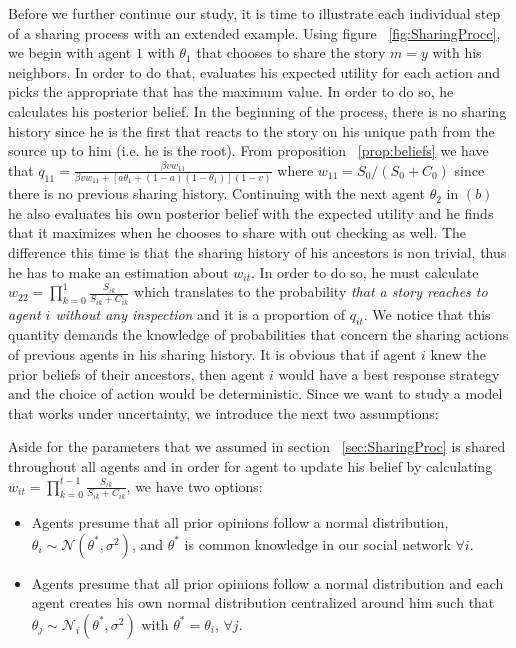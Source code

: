 Before we further continue our study, it is time to illustrate each individual step of a sharing process with an extended example. Using figure ~\ref{fig:SharingProcc}, we begin with agent $1$ with $\theta_1$ that chooses to share the story $m=y$ with his neighbors. In order to do that, evaluates his expected utility for each action and picks the appropriate that has the maximum value. In order to do so, he calculates his posterior belief. In the beginning of the process, there is no sharing history since he is the first that reacts to the story on his unique path from the source up to him (i.e. he is the root). From proposition ~\ref{prop:beliefs} we have that $q_{11}= \displaystyle\frac{\beta v w_{11}}{\beta v w_{11} + [a \theta_{1}+(1-a)(1-\theta_{1})](1-v)}$ where $w_{11}=S_0/(S_0+C_0)$ since there is no previous sharing history. Continuing with the next agent $ \theta_2$ in $(b)$ he also evaluates his own posterior belief with the expected utility and he finds that it maximizes when he chooses to share with out checking as well. The difference this time is that the sharing history of his ancestors is non trivial, thus he has to make an estimation about $w_{it}$. In order to do so, he must calculate $w_{22} = \displaystyle\prod_{k=0}^{1} \frac{S_{ik}}{S_{ik}+C_{ik}}$ which translates to the probability \textit{that a story reaches to agent $i$ without any inspection} and it is a proportion of $q_{it}$. We notice that this quantity demands the knowledge of probabilities that concern the sharing actions of previous agents in his sharing history. It is obvious that if agent $i$ knew the prior beliefs of their ancestors, then agent $i$ would have a best response strategy and the choice of action would be deterministic. Since we want to study a model that works under uncertainty, we introduce the next two assumptions:
\begin{assumption}
Aside for the parameters that we assumed in section ~\ref{sec:SharingProc} is shared throughout all agents and in order for agent to update his belief by calculating $w_{it} = \displaystyle\prod_{k=0}^{t-1} \frac{S_{ik}}{S_{ik}+C_{ik}}$, we have two options:
	\begin{itemize}
		\item Agents presume that all prior opinions follow a normal distribution, $\theta_i \sim \mathcal{N} (\theta^*,\sigma^2)$, and $\theta^*$ is common knowledge in our social network $\forall i$.
		\item Agents presume that all prior opinions follow a normal distribution and each agent creates his own normal distribution centralized around him such that $\theta_j \sim \mathcal{N}_i (\theta^*,\sigma^2)$ with $\theta^* = \theta_i$, $\forall j$.
	\end{itemize}
\label{assum:AgentsPerceptionOfThetas}
\end{assumption}
